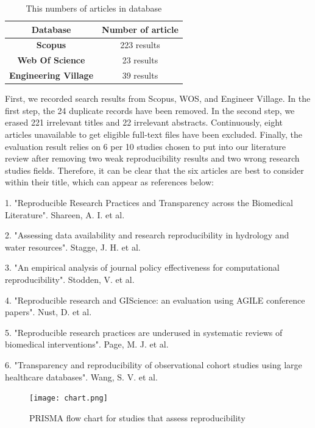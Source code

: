 \documentclass[
10pt, %
a4paper, %
oneside, %
headinclude,footinclude, %
BCOR5mm, %
]{scrartcl}
\begin{document}
\begin{table}[h]
\centering
\begin{tabular}{|c|clll|}
\hline
Database                		& \multicolumn{4}{c|}{\textbf{Number of article}}           \\ \hline
\textbf{Scopus} 			& \multicolumn{4}{c|}{{\color[HTML]{329A9D} 223 results}} 	\\ \hline
\textbf{Web Of Science} 	& \multicolumn{4}{c|}{{\color[HTML]{329A9D} 23 results}}    \\ \hline
\textbf{Engineering Village}	& \multicolumn{4}{c|}{{\color[HTML]{329A9D} 39 results}}   \\ \hline
\end{tabular}
\caption{This numbers of articles in database}
\label{table1}
\end{table}
First, we recorded search results from Scopus, WOS, and Engineer Village. In the first step, the 24 duplicate records have been removed. In the second step, we erased 221 irrelevant titles and 22 irrelevant abstracts. Continuously, eight articles unavailable to get eligible full-text files have been excluded. Finally, the evaluation result relies on 6 per 10 studies chosen to put into our literature review after removing two weak reproducibility results and two wrong research studies fields. Therefore, it can be clear that the six articles are best to consider within their title, which can appear as references below:

1. "Reproducible Research Practices and Transparency across the Biomedical Literature". Shareen, A. I. et al.

2. "Assessing data availability and research reproducibility in hydrology and water resources". Stagge, J. H. et al.

3. "An empirical analysis of journal policy effectiveness for computational reproducibility". Stodden, V. et al.

4. "Reproducible research and GIScience: an evaluation using AGILE conference papers". Nust, D. et al.

5. "Reproducible research practices are underused in systematic reviews of biomedical interventions". Page, M. J. et al.

6. "Transparency and reproducibility of observational cohort studies using large healthcare databases". Wang, S. V. et al.

\begin{figure}[H]
    \centering
    \texttt{[image: chart.png]}
    \caption{PRISMA flow chart for studies that assess reproducibility}
    \label{fig:PRISMA_chart_studies_assess_reproducibility}
\end{figure}
\newpage
\end{document}
